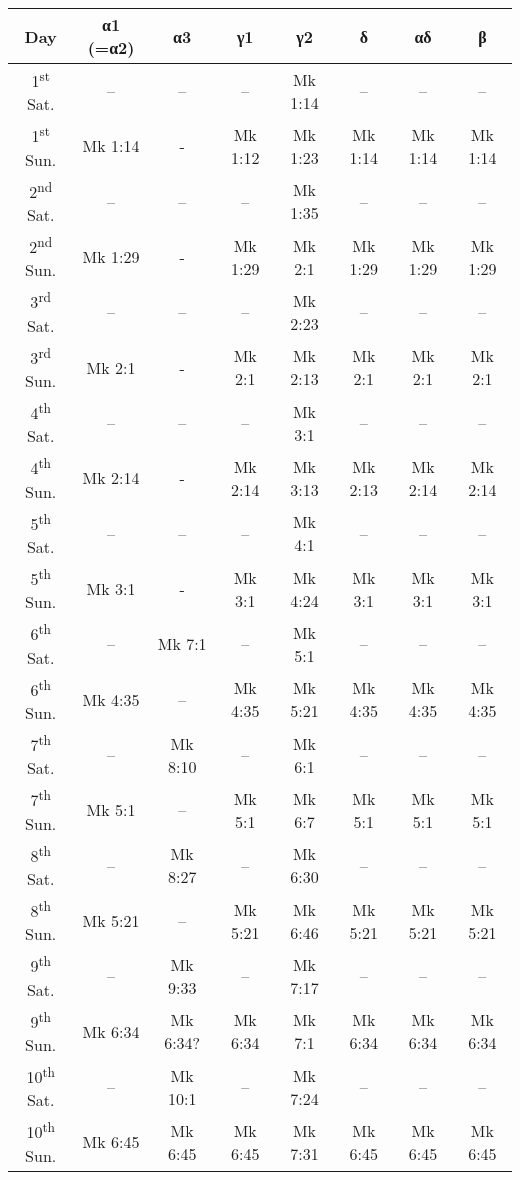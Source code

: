 \begin{tabular}{ c c c c c c c c } 
\toprule
 Day & α1 (=α2) & α3 & γ1 & γ2 & δ & αδ & β \\
\midrule

 1\textsuperscript{st} Sat. & -- & -- & -- & Mk 1:14 & -- & -- & -- \\
 1\textsuperscript{st} Sun. & Mk 1:14 & - & Mk 1:12 & Mk 1:23 & Mk 1:14 & Mk 1:14 & Mk 1:14 \\
 2\textsuperscript{nd} Sat. & -- & -- & -- & Mk 1:35 & -- & -- & -- \\
 2\textsuperscript{nd} Sun. & Mk 1:29 & - & Mk 1:29 & Mk 2:1 & Mk 1:29 & Mk 1:29 & Mk 1:29 \\
 3\textsuperscript{rd} Sat. & -- & -- & -- & Mk 2:23 & -- & -- & -- \\
 3\textsuperscript{rd} Sun. & Mk 2:1 & - & Mk 2:1 & Mk 2:13 & Mk 2:1 & Mk 2:1 & Mk 2:1 \\
 4\textsuperscript{th} Sat. & -- & -- & -- & Mk 3:1 & -- & -- & -- \\
 4\textsuperscript{th} Sun. & Mk 2:14 & - & Mk 2:14 & Mk 3:13 & Mk 2:13 & Mk 2:14 & Mk 2:14 \\
 5\textsuperscript{th} Sat. & -- & -- & -- & Mk 4:1 & -- & -- & -- \\
 5\textsuperscript{th} Sun. & Mk 3:1 & - & Mk 3:1 & Mk 4:24 & Mk 3:1 & Mk 3:1 & Mk 3:1 \\
 6\textsuperscript{th} Sat. & -- & Mk 7:1 & -- & Mk 5:1 & -- & -- & -- \\
 6\textsuperscript{th} Sun. & Mk 4:35 & -- & Mk 4:35 & Mk 5:21 & Mk 4:35 & Mk 4:35 & Mk 4:35 \\
 7\textsuperscript{th} Sat. & -- & Mk 8:10 & -- & Mk 6:1 & -- & -- & -- \\
 7\textsuperscript{th} Sun. & Mk 5:1 & -- & Mk 5:1 & Mk 6:7 & Mk 5:1 & Mk 5:1 & Mk 5:1 \\
 8\textsuperscript{th} Sat. & -- & Mk 8:27 & -- & Mk 6:30 & -- & -- & -- \\
 8\textsuperscript{th} Sun. & Mk 5:21 & -- & Mk 5:21 & Mk 6:46 & Mk 5:21 & Mk 5:21 & Mk 5:21 \\
 9\textsuperscript{th} Sat. & -- & Mk 9:33 & -- & Mk 7:17 & -- & -- & -- \\
 9\textsuperscript{th} Sun. & Mk 6:34 & Mk 6:34? & Mk 6:34 & Mk 7:1 & Mk 6:34 & Mk 6:34 & Mk 6:34 \\
 10\textsuperscript{th} Sat. & -- & Mk 10:1 & -- & Mk 7:24 & -- & -- & -- \\
 10\textsuperscript{th} Sun. & Mk 6:45 & Mk 6:45 & Mk 6:45 & Mk 7:31 & Mk 6:45 & Mk 6:45 & Mk 6:45 \\

\end{tabular}
